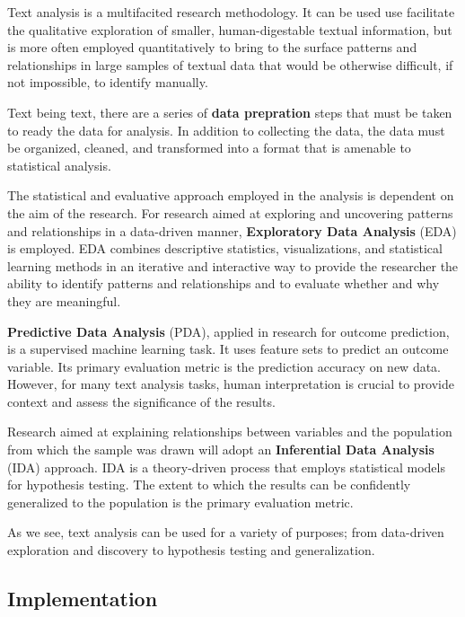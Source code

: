 \documentclass[
  letterpaper,
  DIV=11,
  numbers=noendperiod]{scrreport}
\theoremstyle{definition}
\theoremstyle{remark}
\begin{document}
Text analysis is a multifacited research methodology. It can be used use
facilitate the qualitative exploration of smaller, human-digestable
textual information, but is more often employed quantitatively to bring
to the surface patterns and relationships in large samples of textual
data that would be otherwise difficult, if not impossible, to identify
manually.

Text being text, there are a series of \textbf{data prepration} steps
that must be taken to ready the data for analysis. In addition to
collecting the data, the data must be organized, cleaned, and
transformed into a format that is amenable to statistical analysis.

The statistical and evaluative approach employed in the analysis is
dependent on the aim of the research. For research aimed at exploring
and uncovering patterns and relationships in a data-driven manner,
\textbf{Exploratory Data Analysis} (EDA) is employed. EDA combines
descriptive statistics, visualizations, and statistical learning methods
in an iterative and interactive way to provide the researcher the
ability to identify patterns and relationships and to evaluate whether
and why they are meaningful.

\textbf{Predictive Data Analysis} (PDA), applied in research for outcome
prediction, is a supervised machine learning task. It uses feature sets
to predict an outcome variable. Its primary evaluation metric is the
prediction accuracy on new data. However, for many text analysis tasks,
human interpretation is crucial to provide context and assess the
significance of the results.

Research aimed at explaining relationships between variables and the
population from which the sample was drawn will adopt an
\textbf{Inferential Data Analysis} (IDA) approach. IDA is a
theory-driven process that employs statistical models for hypothesis
testing. The extent to which the results can be confidently generalized
to the population is the primary evaluation metric.

As we see, text analysis can be used for a variety of purposes; from
data-driven exploration and discovery to hypothesis testing and
generalization.

\hypertarget{implementation}{%
\subsection{Implementation}\label{implementation}}
\end{document}
